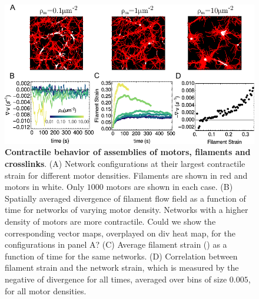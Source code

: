 \documentclass[11pt]{article}
\begin{document}
\begin{figure}[H]
  \centering
  \includegraphics[width=\columnwidth]{figs/divergence/div_fig.pdf}
  \caption{%
  \label{fig:contract}%
  {\bf Contractile behavior of assemblies of motors, filaments and crosslinks}. (A) 
  Network {\color{red}configurations} at their largest contractile {\color{red}strain} for different motor densities. Filaments {\color{red}are shown} in red and motors in white. Only $1000$ motors are shown in each case.
  (B) {\color{red}Spatially averaged} divergence {\color{red}of filament flow field} as a function of time for
  networks of varying motor density. Networks with a higher density of motors are more contractile. {\color{blue} Could we show the corresponding vector maps, overplayed on div heat map, for the configurations in panel A?}
  (C) Average filament strain () as a function of time for the same networks. 
  (D) Correlation between filament strain and the network strain, {\color{red}which is} measured 
{\color{red}by the} negative of divergence for all times, averaged over bins of size $0.005$, for all motor densities.
 } 
\end{figure}  
\end{document}
